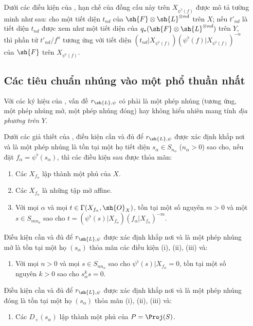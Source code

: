 \documentclass[oneside,10pt]{amsart}
\newcommand{\oldpage}[2][]{\marginnote{\normalfont\footnotesize\textbf{#1}~|~#2}\ignorespaces}
\let\EGAOriginalLabel\label
\renewcommand{\label}[1]{\phantomsection\EGAOriginalLabel{#1}}
\begin{document}
\begin{remarks}[3.7.9]
\begin{enumerate}
    Dưới các điều kiện của , hạn chế của đồng cấu này trên $X_{\psi^\flat(f)}$ được mô tả tường minh như sau:
    cho một tiết diện $t_{nd}$ của $\sh{F}\otimes\sh{L}^{\otimes nd}$ trên $X$; nếu $t'_{nd}$ là tiết diện $t_{nd}$ được xem như một tiết diện của $q_*(\sh{F}\otimes\sh{L}^{\otimes nd})$ trên $Y$, thì phần tử $t'_{nd}/f^n$ tương ứng với tiết diện $(t_{nd}|X_{\psi^\flat(f)})(\psi^\flat(f)|X_{\psi^\flat(f)})^{-n}$ của $\sh{F}$ trên $X_{\psi^\flat(f)}$.
\end{enumerate}
\end{remarks}
\oldpage[II]{69}

\subsection{Các tiêu chuẩn nhúng vào một phổ thuần nhất}
\label{subsection:II.3.8}

\begin{env}[3.8.1]
\label{II.3.8.1}
Với các ký hiệu của , vấn đề $r_{\sh{L},\psi}$ có phải là một phép nhúng (tương ứng, một phép nhúng mở, một phép nhúng đóng) hay không hiển nhiên mang tính \emph{địa phương trên $Y$}.
\end{env}

\begin{proposition}[3.8.2]
\label{II.3.8.2}
Dưới các giả thiết của , điều kiện cần và đủ để $r_{\sh{L},\psi}$ được xác định khắp nơi và là một phép nhúng là tồn tại một họ tiết diện $s_\alpha\in S_{n_\alpha}$ ($n_\alpha>0$) sao cho, nếu đặt $f_\alpha=\psi^\flat(s_\alpha)$, thì các điều kiện sau được thỏa mãn:
\begin{enumerate}
  \item[(i)] Các $X_{f_\alpha}$ lập thành một phủ của $X$.
  \item[(ii)] Các $X_{f_\alpha}$ là những tập mở affine.
  \item[(iii)] Với mọi $\alpha$ và mọi $t\in\Gamma(X_{f_\alpha},\sh{O}_X)$, tồn tại một số nguyên $m>0$ và một $s\in S_{mn_\alpha}$ sao cho $t=(\psi^\flat(s)|X_{f_\alpha})(f_\alpha|X_{f_\alpha})^{-m}$.
\end{enumerate}

Điều kiện cần và đủ để $r_{\sh{L},\psi}$ được xác định khắp nơi và là một phép nhúng mở là tồn tại một họ $(s_\alpha)$ thỏa mãn các điều kiện (i), (ii), (iii) và:
\begin{enumerate}
  \item[(iv)] Với mọi $n>0$ và mọi $s\in S_{nn_\alpha}$ sao cho $\psi^\flat(s)|X_{f_\alpha}=0$, tồn tại một số nguyên $k>0$ sao cho $s_\alpha^ks=0$.
\end{enumerate}

Điều kiện cần và đủ để $r_{\sh{L},\psi}$ được xác định khắp nơi và là một phép nhúng đóng là tồn tại một họ $(s_\alpha)$ thỏa mãn (i), (ii), (iii) và:
\begin{enumerate}
  \item[(v)] Các $D_+(s_\alpha)$ lập thành một phủ của $P=\Proj(S)$.
\end{enumerate}
\end{proposition}
\end{document}
